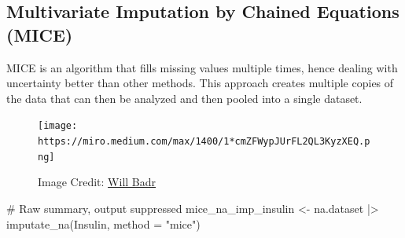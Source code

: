 \documentclass[
  letterpaper,
  DIV=11,
  numbers=noendperiod]{scrreprt}
\newenvironment{Shaded}{\begin{snugshade}}{\end{snugshade}}
\newcommand{\AttributeTok}[1]{\textcolor[rgb]{0.40,0.45,0.13}{#1}}
\newcommand{\CommentTok}[1]{\textcolor[rgb]{0.37,0.37,0.37}{#1}}
\newcommand{\FunctionTok}[1]{\textcolor[rgb]{0.28,0.35,0.67}{#1}}
\newcommand{\NormalTok}[1]{\textcolor[rgb]{0.00,0.23,0.31}{#1}}
\newcommand{\OtherTok}[1]{\textcolor[rgb]{0.00,0.23,0.31}{#1}}
\newcommand{\SpecialCharTok}[1]{\textcolor[rgb]{0.37,0.37,0.37}{#1}}
\newcommand{\StringTok}[1]{\textcolor[rgb]{0.13,0.47,0.30}{#1}}
\begin{document}
\hypertarget{multivariate-imputation-by-chained-equations-mice}{%
\subsection{Multivariate Imputation by Chained Equations
(MICE)}\label{multivariate-imputation-by-chained-equations-mice}}

MICE is an algorithm that fills missing values multiple times, hence
dealing with uncertainty better than other methods. This approach
creates multiple copies of the data that can then be analyzed and then
pooled into a single dataset.

\begin{figure}

{\centering \texttt{[image: https://miro.medium.com/max/1400/1*cmZFWypJUrFL2QL3KyzXEQ.png]}

}

\caption{Image Credit:
\href{https://towardsdatascience.com/6-different-ways-to-compensate-for-missing-values-data-imputation-with-examples-6022d9ca0779}{Will
Badr}}

\end{figure}

\begin{Shaded}
\begin{Highlighting}[]
\CommentTok{\# Raw summary, output suppressed}
\NormalTok{mice\_na\_imp\_insulin }\OtherTok{\textless{}{-}}\NormalTok{ na.dataset }\SpecialCharTok{|\textgreater{}}
  \FunctionTok{imputate\_na}\NormalTok{(Insulin, }\AttributeTok{method =} \StringTok{"mice"}\NormalTok{)}
\end{Highlighting}
\end{Shaded}
\end{document}
